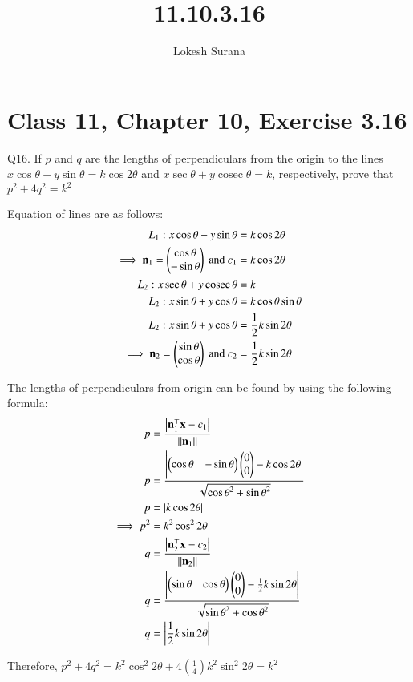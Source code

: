 \documentclass[journal,12pt,twocolumn]{IEEEtran}
\renewcommand{\vec}[1]{\boldsymbol{\mathbf{#1}}}
\begin{document}
\newcommand{\cosec}{\mathop{\mathrm{cosec}}}

\vspace{3cm}
\title{11.10.3.16}
\author{Lokesh Surana}
\maketitle
\section*{Class 11, Chapter 10, Exercise 3.16}

Q16. If ${p}$ and ${q}$ are the lengths of perpendiculars from the origin to the lines ${x}\cos\theta - {y}\sin\theta =  {k}\cos2\theta$ and ${x}\sec\theta + {y}\cosec\theta = {k}$, respectively, prove that ${p}^2 + 4{q}^2 = {k}^2$

\solution Equation of lines are as follows:
\begin{align}
    {L}_1: {x}\cos\theta - {y}\sin\theta &=  {k}\cos2\theta \\
    \implies \vec{n}_1 = \myvec{\cos\theta \\ -\sin\theta} \text{ and } {c}_1 &= {k}\cos2\theta\\
    {L}_2: {x}\sec\theta + {y}\cosec\theta &= {k} \\
    {L}_2: {x}\sin\theta + {y}\cos\theta &= {k}\cos\theta\sin\theta \\
    {L}_2: {x}\sin\theta + {y}\cos\theta &= \frac{1}{2}{k}\sin2\theta \\
    \implies \vec{n}_2 = \myvec{\sin\theta \\ \cos\theta} \text{ and } {c}_2 &= \frac{1}{2}{k}\sin2\theta
\end{align}

The lengths of perpendiculars from origin can be found by using the following formula:
\begin{align}
    {p} &= \frac{\abs{  \vec{n}_1^{\top}\vec{x}-{c}_1 }}{\norm{\vec{n}_1}} \\
    {p} &= \frac{\abs{ \myvec{\cos\theta & -\sin\theta}\myvec{0\\0} - {k}\cos2\theta}}{\sqrt{{\cos\theta}^2 + {\sin\theta}^2}} \\
    {p} &= \abs{{k}\cos2\theta} \\
    \implies {p}^2 &= {k}^2\cos^2 2\theta\\
    {q} &= \frac{\abs{  \vec{n}_2^{\top}\vec{x}-{c}_2 }}{\norm{\vec{n}_2}} \\
    {q} &= \frac{\abs{ \myvec{\sin\theta & \cos\theta}\myvec{0\\0} - \frac{1}{2}{k}\sin2\theta}}{\sqrt{{\sin\theta}^2 + {\cos\theta}^2}} \\
    {q} &= \abs{ \frac{1}{2}{k}\sin2\theta}\\
\end{align}

Therefore, \newline 
${p}^2 + 4{q}^2 = {k}^2\cos^2 2\theta + 4(\frac{1}{4}){k}^2\sin^2 2\theta = {k}^2$
\end{document}
